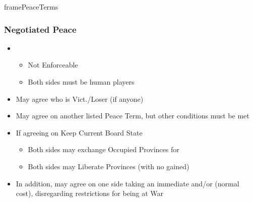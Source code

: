 \documentclass[10pt]{article}
\begin{document}
\begin{dynamiccontents*}{framePeaceTerms}
\begin{multicols}{3}
		\subsubsection*{Negotiated Peace}
		\begin{itemize}
			\item {}
			\begin{itemize}
				\item Not Enforceable
				\item Both sides must be human players
			\end{itemize}
			\item May agree who is Vict./Loser (if anyone)
			\item May agree on another listed Peace Term, but other conditions must be met
			\item If agreeing on Keep Current Board State 
			\begin{itemize}
				\item Both sides may exchange Occupied Provinces for \ducats
				\item Both sides may Liberate Provinces (with no \prestige gained)
			\end{itemize}
			\item In addition, may agree on one side taking an immediate  and/or  (normal cost), disregarding restrictions for being at War
		\end{itemize}
	\end{multicols}
\end{dynamiccontents*}%
\end{document}
